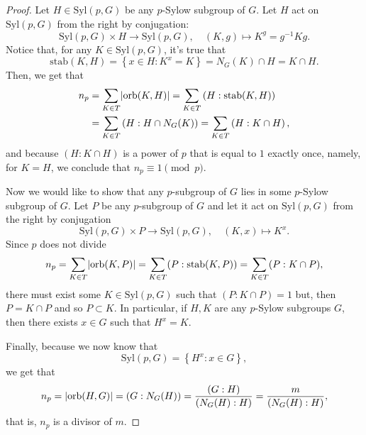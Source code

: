 \begin{proof}
  Let \({H}\in{\text{Syl}(p,G)}\) be any \(p\)-Sylow subgroup of \(G\). Let \(H\) act on \(\text{Syl}(p,G)\) from the right by conjugation:
  \[
    \text{Syl}(p,G)\times{H}\to{\text{Syl}(p,G)},
    \quad
    (K,g)\mapsto{K^{g}=g^{-1}Kg}.
  \]
  Notice that, for any \({K}\in{\text{Syl}(p,G)}\), it's true that
  \[
    \text{stab}(K,H)
    =
    \left\{{x}\in{H}:K^{x}=K\right\}
    =
    N_{G}(K)\cap{H}
    =
    K\cap{H}
    .
  \]
  Then, we get that
  \begin{align*}
    n_{p}
    &=
    \sum_{{K}\in{T}}\lvert\text{orb}(K,H)\rvert
    =
    \sum_{{K}\in{T}}\left(H:\text{stab}(K,H)\right)
    \\
    &=
    \sum_{{K}\in{T}}\left(H:H\cap{N_{G}(K)}\right)
    =
    \sum_{{K}\in{T}}\left(H:K\cap{H}\right)
    ,
  \end{align*}
  and because \(\left(H:K\cap{H}\right)\) is a power of \(p\) that is equal to
  \(1\) exactly once, namely, for \(K=H\), we conclude that
  \(n_{p}\equiv{1}\pmod{p}\).

  Now we would like to show that any \(p\)-subgroup of \(G\) lies in some \(p\)-Sylow subgroup of \(G\). Let \(P\) be any \(p\)-subgroup of \(G\) and let it act on \(\text{Syl}(p,G)\) from the right by conjugation
  \[
    \text{Syl}(p,G)\times{P}\to{\text{Syl}(p,G)},
    \quad
    (K,x)\mapsto{K^{x}}
    .
  \]
  Since \(p\) does not divide
  \[
    n_{p}
    =
    \sum_{{K}\in{T}}\lvert\text{orb}(K,P)\rvert
    =
    \sum_{{K}\in{T}}(P:\text{stab}(K,P))
    =
    \sum_{{K}\in{T}}(P:K\cap{P})
    ,
  \]
  there must exist some \({K}\in{\text{Syl}(p,G)}\) such that \((P:K\cap{P})=1\) but, then \(P=K\cap{P}\) and so \({P}\subset{K}\). In particular, if \(H,K\) are any \(p\)-Sylow subgroups \(G\), then there exists \({x}\in{G}\) such that \(H^{x}=K\).

  Finally, because we now know that
  \[
    \text{Syl}(p,G)
    =
    \left\{H^{x}:{x}\in{G}\right\}
    ,
  \]
  we get that
  \[
    n_{p}
    =
    \lvert\text{orb}(H,G)\rvert
    =
    (G:N_{G}(H))
    =
    \frac{(G:H)}{(N_{G}(H):H)}
    =
    \frac{m}{(N_{G}(H):H)}
    ,
  \]
  that is, \(n_{p}\) is a divisor of \(m\).
\end{proof}
